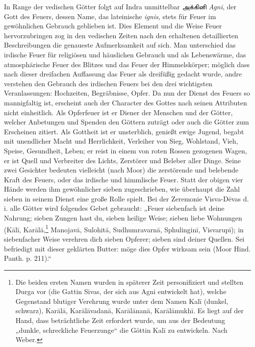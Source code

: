 \documentclass{article}
\newcommand{\TamilText}[1]{\texttamil{#1}}
\newcommand{\tam}[1]{\TamilText{#1}}
\begin{document}
In Range der vedischen Götter folgt auf Indra unmittelbar \tam{அக்கினி} \emph{Agni}, der Gott des Feuers, dessen Name, das lateinische \emph{ignis}, stets für Feuer im gewöhnlichen Gebrauch geblieben ist. Dies Element und die Weise Feuer hervorzubringen zog in den vedischen Zeiten nach den erhaltenen detaillierten Beschreibungen die genaueste Aufmerksamkeit auf sich. Man unterschied das irdische Feuer für religiösen und häuslichen Gebrauch und als Lebenswärme, das atmosphärische Feuer des Blitzes und das Feuer der Himmelskörper; möglich dass nach dieser dreifachen Auffassung das Feuer als dreifüßig gedacht wurde, andre verstehen den Gebrauch des irdischen Feuers bei den drei wichtigsten Veranlassungen: Hochzeiten, Begräbnisse, Opfer. Da nun der Dienst des Feuers so mannigfaltig ist, erscheint auch der Character des Gottes nach seinen Attributen nicht einheitlich. Als Opferfeuer ist er Diener der Menschen und der Götter, welcher Anbetungen und Spenden den Göttern zuträgt oder auch die Götter zum Erscheinen zitiert. Als Gottheit ist er unsterblich, genießt ewige Jugend, begabt mit unendlicher Macht und Herrlichkeit, Verleiher von Sieg, Wohlstand, Vieh, Speise, Gesundheit, Leben; er reist in einem von roten Rossen gezogenen Wagen, er ist Quell und Verbreiter des Lichts, Zerstörer und Beleber aller Dinge. Seine zwei Gesichter bedeuten vielleicht (nach Moor) die zerstörende und belebende Kraft des Feuers, oder das irdische und himmlische Feuer. Statt der obigen vier Hände werden ihm gewöhnlicher sieben zugeschrieben, wie überhaupt die Zahl sieben in seinem Dienst eine große Rolle spielt. Bei der Zeremonie Visva-D\={e}vas d. i. alle Götter wird folgendes Gebet gebraucht: „Feuer siebenfach ist deine Nahrung; sieben Zungen hast du, sieben heilige Weise; sieben liebe Wohnungen (K\={a}l\={i}, Kar\={a}l\={a},\footnote{Die beiden ersten Namen wurden in späterer Zeit personifiziert und stellten Durga vor (die Gattin Sivas, der sich aus Agni entwickelt hat), welche Gegenstand blutiger Verehrung wurde unter dem Namen Kal\={i} (dunkel, schwarz), Kar\={a}l\={a}, Kar\={a}l\={a}vadan\={a}, Kar\={a}l\={a}nan\={a}, Kar\={a}l\={a}mukh\={i}. Es liegt auf der Hand, dass beträchtliche Zeit erfordert wurde, um aus der Bedeutung „dunkle, schreckliche Feuerzunge“ die Göttin Kal\={i} zu entwickeln. Nach Weber.} Manojav\={a}, Sulohit\={a}, Sudhumravarn\={a}, Sphulingin\={i}, Visvarup\={i}); in siebenfacher Weise verehren dich sieben Opferer; sieben sind deiner Quellen. Sei befriedigt mit dieser geklärten Butter: möge dies Opfer wirksam sein (Moor Hind. Panth. p. 211).“
\end{document}
